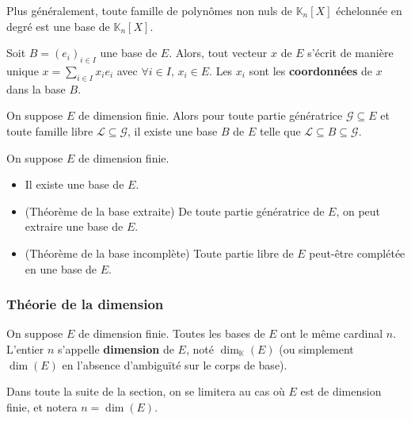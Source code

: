 
	\begin{proposition}
		Plus généralement, toute famille de polynômes non nuls de $\mathbb{K}_n[X]$ échelonnée en degré est une base de $\mathbb{K}_n[X]$.
	\end{proposition}


	\begin{proposition}
		Soit $B = (e_i)_{i \in I}$ une base de $E$. Alors, tout vecteur $x$ de $E$ s'écrit de manière unique $x = \sum_{i \in I} x_i e_i$ avec $\forall i \in I, \, x_i \in E$. Les $x_i$ sont les \textbf{coordonnées} de $x$ dans la base $B$.
	\end{proposition}

	\begin{theorem}
		On suppose $E$ de dimension finie. Alors pour toute partie génératrice $\mathcal{G} \subseteq E$ et toute famille libre $\mathcal{L} \subseteq \mathcal{G}$, il existe une base $B$ de $E$ telle que $\mathcal{L} \subseteq B \subseteq \mathcal{G}$.
	\end{theorem}

	\begin{corollary}
		On suppose $E$ de dimension finie.
		\begin{itemize}
			\item Il existe une base de $E$.
			\item (Théorème de la base extraite) De toute partie génératrice de $E$, on peut extraire une base de $E$.
			\item (Théorème de la base incomplète) Toute partie libre de $E$ peut-être complétée en une base de $E$.
		\end{itemize}
	\end{corollary}

	\subsubsection{Théorie de la dimension}

	\begin{theorem}
		On suppose $E$ de dimension finie. Toutes les bases de $E$ ont le même cardinal $n$. L'entier $n$ s'appelle \textbf{dimension} de $E$, noté $\dim_{\mathbb{K}}(E)$ (ou simplement $\dim(E)$ en l'absence d'ambiguïté sur le corps de base).
	\end{theorem}

	Dans toute la suite de la section, on se limitera au cas où $E$ est de dimension finie, et notera $n = \dim(E)$.

